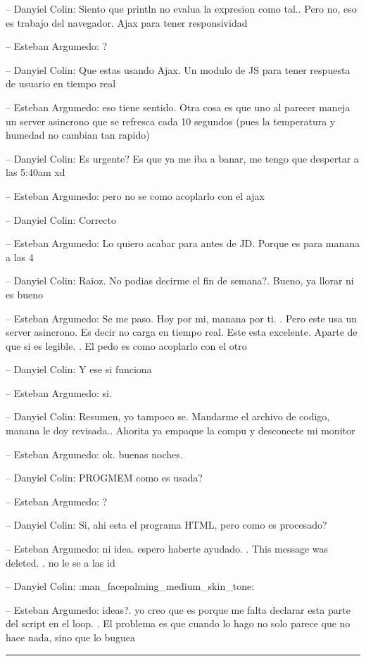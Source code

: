 -- Danyiel Colin: Siento que println no evalua la expresion como tal..
Pero no, eso es trabajo del navegador. Ajax para tener responsividad

-- Esteban Argumedo: ?

-- Danyiel Colin: Que estas usando Ajax. Un modulo de JS para tener
respuesta de usuario en tiempo real

-- Esteban Argumedo: eso tiene sentido. Otra cosa es que uno al parecer
maneja un server asincrono que se refresca cada 10 segundos (pues la
temperatura y humedad no cambian tan rapido)

-- Danyiel Colin: Es urgente? Es que ya me iba a banar, me tengo que
despertar a las 5:40am xd

-- Esteban Argumedo: pero no se como acoplarlo con el ajax

-- Danyiel Colin: Correcto

-- Esteban Argumedo: Lo quiero acabar para antes de JD. Porque es para
manana a las 4

-- Danyiel Colin: Raioz. No podias decirme el fin de semana?. Bueno, ya
llorar ni es bueno

-- Esteban Argumedo: Se me paso. Hoy por mi, manana por ti. . Pero este
usa un server asincrono. Es decir no carga en tiempo real. Este esta
excelente. Aparte de que si es legible. . El pedo es como acoplarlo con
el otro

-- Danyiel Colin: Y ese si funciona

-- Esteban Argumedo: si.

-- Danyiel Colin: Resumen, yo tampoco se. Mandarme el archivo de codigo,
manana le doy revisada.. Ahorita ya empaque la compu y desconecte mi
monitor

-- Esteban Argumedo: ok. buenas noches.

-- Danyiel Colin: PROGMEM como es usada?

-- Esteban Argumedo: ?

-- Danyiel Colin: Si, ahi esta el programa HTML, pero como es procesado?

-- Esteban Argumedo: ni idea. espero haberte ayudado. . This message was
deleted. . no le se a las id

-- Danyiel Colin: :man\_facepalming\_medium\_skin\_tone:

-- Esteban Argumedo: ideas?. yo creo que es porque me falta declarar
esta parte del script en el loop. . El problema es que cuando lo hago no
solo parece que no hace nada, sino que lo buguea

\begin{center}\rule{0.5\linewidth}{0.5pt}\end{center}

